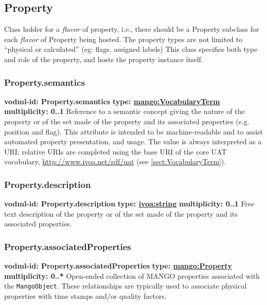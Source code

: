   \subsection{Property}
  \label{sect:Property}
    Class holder for a \textit{flavor} of property, i.e., there should be a Property subclass for each \textit{flavor} of Property being hosted. The property types are not limited to “physical or calculated” (eg: flags, assigned labels) This class specifies both type and role of the property, and hosts the property instance itself.

    \subsubsection{Property.semantics}
      \textbf{vodml-id: Property.semantics} \newline
      \textbf{type: \hyperref[sect:VocabularyTerm]{mango:VocabularyTerm}} \newline
      \textbf{multiplicity: 0..1} \newline
      Reference to a semantic concept giving the nature of the property or of the set made of the property and its associated properties (e.g. position and flag). This attribute is intended to be machine-readable and to assist automated property presentation, and usage. The value is always interpreted as a URI; relative URIs are completed using the base URI of the core UAT vocabulary, \url{http://www.ivoa.net/rdf/uat} (see \ref{sect:VocabularyTerm}).

    \subsubsection{Property.description}
      \textbf{vodml-id: Property.description} \newline
      \textbf{type: \hyperref[sect:ivoa]{ivoa:string}} \newline
      \textbf{multiplicity: 0..1} \newline
      Free text description of the property or of the set made of the property and its associated properties.

    \subsubsection{Property.associatedProperties}
      \textbf{vodml-id: Property.associatedProperties} \newline
      \textbf{type: \hyperref[sect:Property]{mango:Property}} \newline
      \textbf{multiplicity: 0..*} \newline
      Open-ended collection of MANGO properties associated with the \texttt{MangoObject}. These relationships are typically used to associate physical properties with time stamps and/or quality factors.


